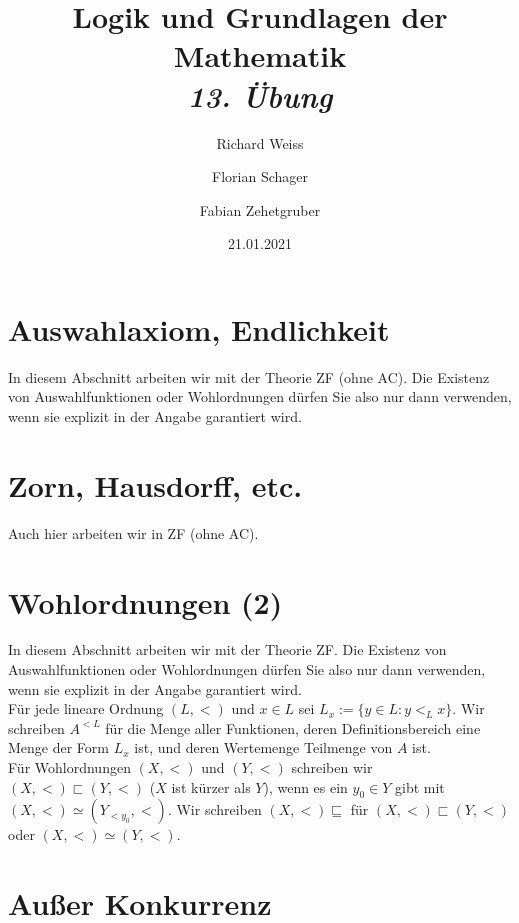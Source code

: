 \documentclass{article}
\title
{
  Logik und Grundlagen der Mathematik \\
  \vspace{4pt}
  \normalsize
  \textit{13. Übung}
}
\author
{
  Richard Weiss
  \and
  Florian Schager
  \and
  Fabian Zehetgruber
}
\date{21.01.2021}
\begin{document}
\maketitle

\section*{Auswahlaxiom, Endlichkeit}

In diesem Abschnitt arbeiten wir mit der Theorie ZF (ohne AC). Die Existenz von
Auswahlfunktionen oder Wohlordnungen dürfen Sie also nur dann verwenden, wenn sie
explizit in der Angabe garantiert wird.



\section*{Zorn, Hausdorff, etc.}

Auch hier arbeiten wir in ZF (ohne AC).






\section*{Wohlordnungen (2)}

In diesem Abschnitt arbeiten wir mit der Theorie ZF. Die Existenz von Auswahlfunktionen
oder Wohlordnungen dürfen Sie also nur dann verwenden, wenn sie explizit in der Angabe
garantiert wird. \\
Für jede lineare Ordnung $(L,<)$ und $x \in L$ sei $L_x := \{y \in L: y <_L x\}$.
Wir schreiben $A^{<L}$ für die Menge aller Funktionen, deren Definitionsbereich eine
Menge der Form $L_x$ ist, und deren Wertemenge Teilmenge von $A$ ist. \\
Für Wohlordnungen $(X, <)$ und $(Y,<)$ schreiben wir $(X,<) \sqsubset (Y,<)$
(\glqq $X$ ist kürzer als $Y$\grqq), wenn es ein $y_0 \in Y$ gibt mit
$(X, <) \simeq (Y_{<y_0},<)$. Wir schreiben $(X,<) \sqsubseteq$ für
\glqq$(X,<) \sqsubset (Y,<)$ oder $(X,<) \simeq (Y,<)$\grqq.




\section*{Außer Konkurrenz}


\end{document}
